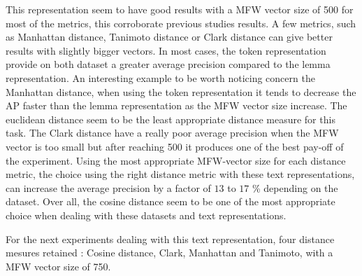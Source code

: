 This representation seem to have good results with a MFW vector size of 500 for most of the metrics, this corroborate previous studies results.
A few metrics, such as Manhattan distance, Tanimoto distance or Clark distance can give better results with slightly bigger vectors.
In most cases, the token representation provide on both dataset a greater average precision compared to the lemma representation.
An interesting example to be worth noticing concern the Manhattan distance, when using the token representation it tends to decrease the AP faster than the lemma representation as the MFW vector size increase.
The euclidean distance seem to be the least appropriate distance measure for this task.
The Clark distance have a really poor average precision when the MFW vector is too small but after reaching 500 it produces one of the best pay-off of the experiment.
Using the most appropriate MFW-vector size for each distance metric, the choice using the right distance metric with these text representations, can increase the average precision by a factor of $13$ to $17$ \% depending on the dataset.
Over all, the cosine distance seem to be one of the most appropriate choice when dealing with these datasets and text representations.

For the next experiments dealing with this text representation, four distance mesures retained : Cosine distance, Clark, Manhattan and Tanimoto, with a MFW vector size of 750.

